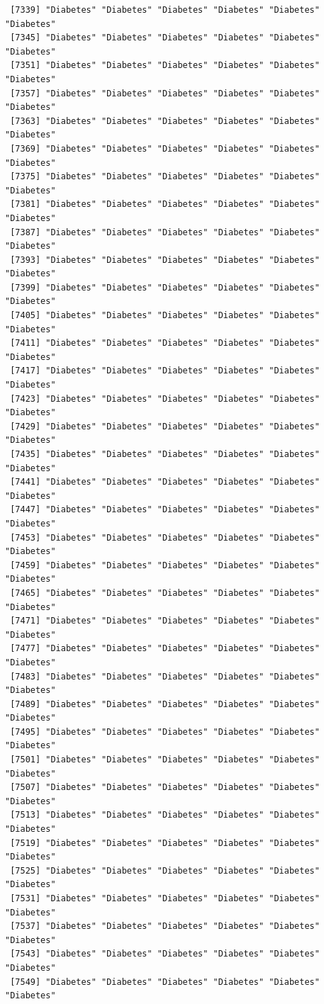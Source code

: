 \documentclass[
  letterpaper,
  DIV=11,
  numbers=noendperiod]{scrartcl}
\begin{document}
\begin{verbatim}
 [7339] "Diabetes" "Diabetes" "Diabetes" "Diabetes" "Diabetes" "Diabetes"
 [7345] "Diabetes" "Diabetes" "Diabetes" "Diabetes" "Diabetes" "Diabetes"
 [7351] "Diabetes" "Diabetes" "Diabetes" "Diabetes" "Diabetes" "Diabetes"
 [7357] "Diabetes" "Diabetes" "Diabetes" "Diabetes" "Diabetes" "Diabetes"
 [7363] "Diabetes" "Diabetes" "Diabetes" "Diabetes" "Diabetes" "Diabetes"
 [7369] "Diabetes" "Diabetes" "Diabetes" "Diabetes" "Diabetes" "Diabetes"
 [7375] "Diabetes" "Diabetes" "Diabetes" "Diabetes" "Diabetes" "Diabetes"
 [7381] "Diabetes" "Diabetes" "Diabetes" "Diabetes" "Diabetes" "Diabetes"
 [7387] "Diabetes" "Diabetes" "Diabetes" "Diabetes" "Diabetes" "Diabetes"
 [7393] "Diabetes" "Diabetes" "Diabetes" "Diabetes" "Diabetes" "Diabetes"
 [7399] "Diabetes" "Diabetes" "Diabetes" "Diabetes" "Diabetes" "Diabetes"
 [7405] "Diabetes" "Diabetes" "Diabetes" "Diabetes" "Diabetes" "Diabetes"
 [7411] "Diabetes" "Diabetes" "Diabetes" "Diabetes" "Diabetes" "Diabetes"
 [7417] "Diabetes" "Diabetes" "Diabetes" "Diabetes" "Diabetes" "Diabetes"
 [7423] "Diabetes" "Diabetes" "Diabetes" "Diabetes" "Diabetes" "Diabetes"
 [7429] "Diabetes" "Diabetes" "Diabetes" "Diabetes" "Diabetes" "Diabetes"
 [7435] "Diabetes" "Diabetes" "Diabetes" "Diabetes" "Diabetes" "Diabetes"
 [7441] "Diabetes" "Diabetes" "Diabetes" "Diabetes" "Diabetes" "Diabetes"
 [7447] "Diabetes" "Diabetes" "Diabetes" "Diabetes" "Diabetes" "Diabetes"
 [7453] "Diabetes" "Diabetes" "Diabetes" "Diabetes" "Diabetes" "Diabetes"
 [7459] "Diabetes" "Diabetes" "Diabetes" "Diabetes" "Diabetes" "Diabetes"
 [7465] "Diabetes" "Diabetes" "Diabetes" "Diabetes" "Diabetes" "Diabetes"
 [7471] "Diabetes" "Diabetes" "Diabetes" "Diabetes" "Diabetes" "Diabetes"
 [7477] "Diabetes" "Diabetes" "Diabetes" "Diabetes" "Diabetes" "Diabetes"
 [7483] "Diabetes" "Diabetes" "Diabetes" "Diabetes" "Diabetes" "Diabetes"
 [7489] "Diabetes" "Diabetes" "Diabetes" "Diabetes" "Diabetes" "Diabetes"
 [7495] "Diabetes" "Diabetes" "Diabetes" "Diabetes" "Diabetes" "Diabetes"
 [7501] "Diabetes" "Diabetes" "Diabetes" "Diabetes" "Diabetes" "Diabetes"
 [7507] "Diabetes" "Diabetes" "Diabetes" "Diabetes" "Diabetes" "Diabetes"
 [7513] "Diabetes" "Diabetes" "Diabetes" "Diabetes" "Diabetes" "Diabetes"
 [7519] "Diabetes" "Diabetes" "Diabetes" "Diabetes" "Diabetes" "Diabetes"
 [7525] "Diabetes" "Diabetes" "Diabetes" "Diabetes" "Diabetes" "Diabetes"
 [7531] "Diabetes" "Diabetes" "Diabetes" "Diabetes" "Diabetes" "Diabetes"
 [7537] "Diabetes" "Diabetes" "Diabetes" "Diabetes" "Diabetes" "Diabetes"
 [7543] "Diabetes" "Diabetes" "Diabetes" "Diabetes" "Diabetes" "Diabetes"
 [7549] "Diabetes" "Diabetes" "Diabetes" "Diabetes" "Diabetes" "Diabetes"

\end{verbatim}
\end{document}
